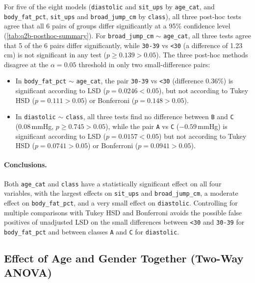 For five of the eight models (\texttt{diastolic} and \texttt{sit\_ups} by \texttt{age\_cat}, and \texttt{body\_fat\_pct}, \texttt{sit\_ups} and \texttt{broad\_jump\_cm} by \texttt{class}), all three post-hoc tests agree that all 6 pairs of groups differ significantly at a 95\% confidence level (\autoref{tab:q2b-posthoc-summary}).
For \texttt{broad\_jump\_cm} $\sim$ \texttt{age\_cat}, all three tests agree that 5 of the 6 pairs differ significantly, while \texttt{30-39} vs \texttt{<30} (a difference of 1.23\,cm) is not significant in any test ($p \geq 0.139 > 0.05$).
The three post-hoc methods disagree at the $\alpha = 0.05$ threshold in only two small-difference pairs:
\begin{itemize}
  \item In \texttt{body\_fat\_pct} $\sim$ \texttt{age\_cat}, the pair \texttt{30-39} vs \texttt{<30} (difference 0.36\%) is significant according to LSD ($p = 0.0246 < 0.05$), but not according to Tukey HSD ($p = 0.111 > 0.05$) or Bonferroni ($p = 0.148 > 0.05$).
  \item In \texttt{diastolic} $\sim$ \texttt{class}, all three tests find no difference between \texttt{B} and \texttt{C} (0.08\,mmHg, $p \geq 0.745 > 0.05$), while the pair \texttt{A} vs \texttt{C} ($-0.59$\,mmHg) is significant according to LSD ($p = 0.0157 < 0.05$) but not according to Tukey HSD ($p = 0.0741 > 0.05$) or Bonferroni ($p = 0.0941 > 0.05$).
\end{itemize}

\paragraph{Conclusions.}
Both \texttt{age\_cat} and \texttt{class} have a statistically significant effect on all four variables, with the largest effects on \texttt{sit\_ups} and \texttt{broad\_jump\_cm}, a moderate effect on \texttt{body\_fat\_pct}, and a very small effect on \texttt{diastolic}.
Controlling for multiple comparisons with Tukey HSD and Bonferroni avoids the possible false positives of unadjusted LSD on the small differences between \texttt{<30} and \texttt{30-39} for \texttt{body\_fat\_pct} and between classes \texttt{A} and \texttt{C} for \texttt{diastolic}.

\subsection{Effect of Age and Gender Together (Two-Way ANOVA)}\label{sec:q2c}

